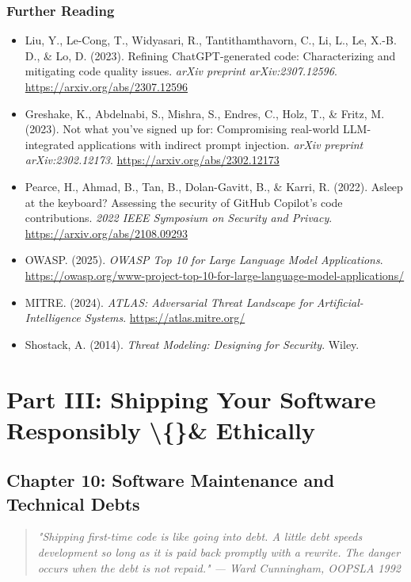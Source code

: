 \documentclass[11pt,a4paper]{book}
\begin{document}
\medskip

\section{Further Reading}

\begin{itemize}
  \item Liu, Y., Le-Cong, T., Widyasari, R., Tantithamthavorn, C., Li, L., Le, X.-B. D., \& Lo, D. (2023). Refining ChatGPT-generated code: Characterizing and mitigating code quality issues. \textit{arXiv preprint arXiv:2307.12596}. \url{https://arxiv.org/abs/2307.12596}
  \item Greshake, K., Abdelnabi, S., Mishra, S., Endres, C., Holz, T., \& Fritz, M. (2023). Not what you've signed up for: Compromising real-world LLM-integrated applications with indirect prompt injection. \textit{arXiv preprint arXiv:2302.12173}. \url{https://arxiv.org/abs/2302.12173}
  \item Pearce, H., Ahmad, B., Tan, B., Dolan-Gavitt, B., \& Karri, R. (2022). Asleep at the keyboard? Assessing the security of GitHub Copilot's code contributions. \textit{2022 IEEE Symposium on Security and Privacy}. \url{https://arxiv.org/abs/2108.09293}
  \item OWASP. (2025). \textit{OWASP Top 10 for Large Language Model Applications}. \url{https://owasp.org/www-project-top-10-for-large-language-model-applications/}
  \item MITRE. (2024). \textit{ATLAS: Adversarial Threat Landscape for Artificial-Intelligence Systems}. \url{https://atlas.mitre.org/}
  \item Shostack, A. (2014). \textit{Threat Modeling: Designing for Security}. Wiley.
\end{itemize}


\part{Part III: Shipping Your Software Responsibly \textbackslash\{\}\& Ethically}


\chapter{Chapter 10: Software Maintenance and Technical Debts}

\begin{quote}
\textit{\textit{"Shipping first-time code is like going into debt. A little debt speeds development so long as it is paid back promptly with a rewrite. The danger occurs when the debt is not repaid."} --- Ward Cunningham, OOPSLA 1992}
\end{quote}
\end{document}
